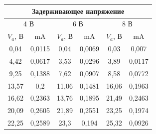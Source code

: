 \documentclass[a4paper, 12pt]{article}
\begin{document}
\begin{table}[h!]
\begin{center}
\begin{tabular}{|cccccc|}
\hline
\multicolumn{6}{|c|}{{ Задерживающее напряжение}}                                                                                                                                                                                                                                 \\ \hline
\multicolumn{2}{|c|}{{ 4 В}}                                                           & \multicolumn{2}{c|}{{ 6 В}}                                                          & \multicolumn{2}{c|}{{ 8 В}}                                     \\ \hline
\multicolumn{1}{|c|}{{ $V_a$, В}}  & \multicolumn{1}{c|}{{ mA}}      & \multicolumn{1}{c|}{{ $V_a$, В}}    & \multicolumn{1}{c|}{{ mA}}     & \multicolumn{1}{c|}{{ $V_a$, В}}    & { mA}     \\ \hline
\multicolumn{1}{|c|}{{ 0,04}}  & \multicolumn{1}{c|}{{ 0,0115}}  & \multicolumn{1}{c|}{{ 0,04}}  & \multicolumn{1}{c|}{{ 0,0069}} & \multicolumn{1}{c|}{{ 0,03}}  & { 0,007}  \\ \hline
\multicolumn{1}{|c|}{{ 4,42}}  & \multicolumn{1}{c|}{{ 0,0617}}  & \multicolumn{1}{c|}{{ 3,53}}  & \multicolumn{1}{c|}{{ 0,0296}} & \multicolumn{1}{c|}{{ 3,89}}  & { 0,0117} \\ \hline
\multicolumn{1}{|c|}{{ 9,25}}  & \multicolumn{1}{c|}{{ 0,1388}}  & \multicolumn{1}{c|}{{ 7,62}}  & \multicolumn{1}{c|}{{ 0,0907}} & \multicolumn{1}{c|}{{ 8,58}}  & { 0,0772} \\ \hline
\multicolumn{1}{|c|}{{ 13,57}} & \multicolumn{1}{c|}{{ 0,2}}     & \multicolumn{1}{c|}{{ 11,06}} & \multicolumn{1}{c|}{{ 0,1481}} & \multicolumn{1}{c|}{{ 16,06}} & { 0,1963} \\ \hline
\multicolumn{1}{|c|}{{ 16,62}} & \multicolumn{1}{c|}{{ 0,2363}}  & \multicolumn{1}{c|}{{ 13,76}} & \multicolumn{1}{c|}{{ 0,1895}} & \multicolumn{1}{c|}{{ 21,49}} & { 0,2463} \\ \hline
\multicolumn{1}{|c|}{{ 20,09}} & \multicolumn{1}{c|}{{ 0,2605}}  & \multicolumn{1}{c|}{{ 21,89}} & \multicolumn{1}{c|}{{ 0,2551}} & \multicolumn{1}{c|}{{ 23,25}} & { 0,1974} \\ \hline
\multicolumn{1}{|c|}{{ 22,25}} & \multicolumn{1}{c|}{{ 0,2589}}  & \multicolumn{1}{c|}{{ 23,3}}  & \multicolumn{1}{c|}{{ 0,194}}  & \multicolumn{1}{c|}{{ 25,32}} & { 0,0926} \\ \hline

\end{tabular}
\end{center}
\end{table}
\end{document}
